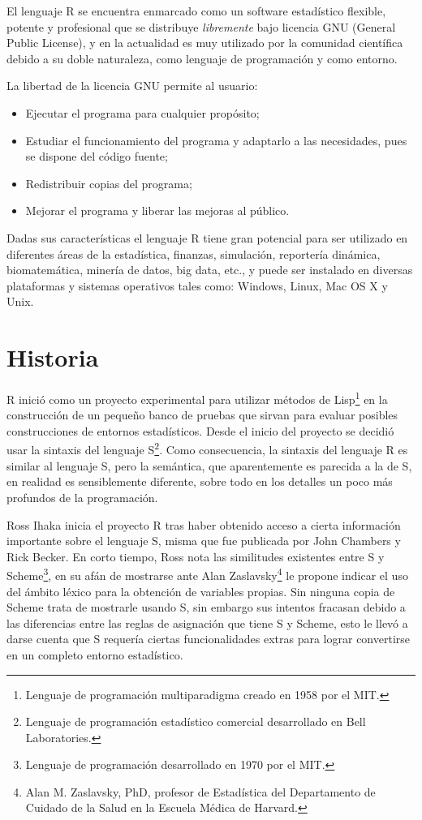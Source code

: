 \documentclass[11pt,a4paper,oneside]{book}\usepackage[]{graphicx}\usepackage[]{color}
\begin{document}
El lenguaje R se encuentra enmarcado como un software estadístico flexible, potente y profesional que se distribuye \emph{libremente} bajo licencia GNU (General Public License), y en la actualidad es muy utilizado por la comunidad científica debido a su doble naturaleza, como lenguaje de programación y como entorno.\newline 

La libertad de la licencia GNU permite al usuario:
\begin{itemize}
   \item Ejecutar el programa para cualquier propósito;
   \item Estudiar el funcionamiento del programa y adaptarlo a las necesidades, pues se dispone del código fuente;
   \item Redistribuir copias del programa;
   \item Mejorar el programa y liberar las mejoras al público.
\end{itemize}

Dadas sus características el lenguaje R tiene gran potencial para ser utilizado en diferentes áreas de la estadística, finanzas, simulación, reportería dinámica, biomatemática, minería de datos, big data, etc., y puede ser instalado en diversas plataformas y sistemas operativos tales como: Windows, Linux, Mac OS X y Unix.

\section{Historia}

R inició como un proyecto experimental para utilizar métodos de Lisp\footnote{Lenguaje de programación multiparadigma creado en 1958 por el MIT.} en la construcción de un pequeño banco de pruebas que sirvan para evaluar posibles construcciones de entornos estadísticos. Desde el inicio del proyecto se decidió usar la sintaxis del lenguaje S\footnote{Lenguaje de programación estadístico comercial desarrollado en Bell Laboratories.}. Como consecuencia, la sintaxis del lenguaje R es similar al lenguaje S, pero la semántica, que aparentemente es parecida a la de S, en realidad es sensiblemente diferente, sobre todo en los detalles un poco más profundos de la programación.\newline

Ross Ihaka inicia el proyecto R tras haber obtenido acceso a cierta información importante sobre el lenguaje S, misma que fue publicada por John Chambers y Rick Becker. En corto tiempo, Ross nota las similitudes existentes entre S y Scheme\footnote{Lenguaje de programación desarrollado en 1970 por el MIT.}, en su afán de mostrarse ante Alan Zaslavsky\footnote{Alan M. Zaslavsky, PhD, profesor de Estadística del Departamento de Cuidado de la Salud en la Escuela Médica de Harvard.} le propone indicar el uso del ámbito léxico para la obtención de variables propias. Sin ninguna copia de Scheme trata de mostrarle usando S, sin embargo sus intentos fracasan debido a las diferencias entre las reglas de asignación que tiene S y Scheme, esto le llevó a darse cuenta que S requería ciertas funcionalidades extras para lograr convertirse en un completo entorno estadístico.\newline
\end{document}
